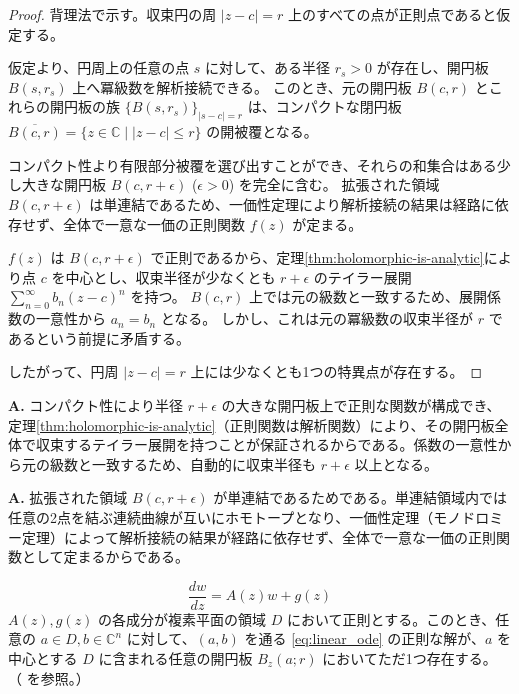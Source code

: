 \begin{proof}
    背理法で示す。収束円の周 $|z-c|=r$ 上のすべての点が正則点であると仮定する。

    仮定より、円周上の任意の点 $s$ に対して、ある半径 $r_s > 0$ が存在し、開円板 $B(s, r_s)$ 上へ冪級数を解析接続できる。
    このとき、元の開円板 $B(c, r)$ とこれらの開円板の族 $\{B(s, r_s)\}_{|s-c|=r}$ は、コンパクトな閉円板 $\overline{B(c, r)} = \{z \in \mathbb{C} \mid |z-c| \le r\}$ の開被覆となる。

    コンパクト性より有限部分被覆を選び出すことができ、それらの和集合はある少し大きな開円板 $B(c, r+\epsilon)$ ($\epsilon > 0$) を完全に含む。
    拡張された領域 $B(c, r+\epsilon)$ は単連結であるため、一価性定理により解析接続の結果は経路に依存せず、全体で一意な一価の正則関数 $f(z)$ が定まる。

    $f(z)$ は $B(c, r+\epsilon)$ で正則であるから、定理\ref{thm:holomorphic-is-analytic}により点 $c$ を中心とし、収束半径が少なくとも $r+\epsilon$ のテイラー展開 $\sum_{n=0}^{\infty}b_{n}(z-c)^{n}$ を持つ。
    $B(c, r)$ 上では元の級数と一致するため、展開係数の一意性から $a_n = b_n$ となる。
    しかし、これは元の冪級数の収束半径が $r$ であるという前提に矛盾する。

    したがって、円周 $|z-c|=r$ 上には少なくとも1つの特異点が存在する。
\end{proof}

\begin{Q}
\textbf{A.} コンパクト性により半径 $r+\epsilon$ の大きな開円板上で正則な関数が構成でき、定理\ref{thm:holomorphic-is-analytic}（正則関数は解析関数）により、その開円板全体で収束するテイラー展開を持つことが保証されるからである。係数の一意性から元の級数と一致するため、自動的に収束半径も $r+\epsilon$ 以上となる。
\end{Q}

\begin{Q}
\textbf{A.} 拡張された領域 $B(c, r+\epsilon)$ が単連結であるためである。単連結領域内では任意の2点を結ぶ連続曲線が互いにホモトープとなり、一価性定理（モノドロミー定理）によって解析接続の結果が経路に依存せず、全体で一意な一価の正則関数として定まるからである。
\end{Q}
\begin{theorem}[線形微分方程式の解の存在円板]\label{thm:linear_existence}
    \begin{equation}\label{eq:linear_ode}
    \frac{dw}{dz}=A(z)w+g(z)
    \end{equation}
    $A(z), g(z)$ の各成分が複素平面の領域 $D$ において正則とする。このとき、任意の $a \in D, b \in \mathbb{C}^{n}$ に対して、$(a,b)$ を通る \eqref{eq:linear_ode} の正則な解が、$a$ を中心とする $D$ に含まれる任意の開円板 $B_{z}(a;r)$ においてただ1つ存在する。
   （\cite[p.56 定理8.6]{book:takano} を参照。）
\end{theorem}

